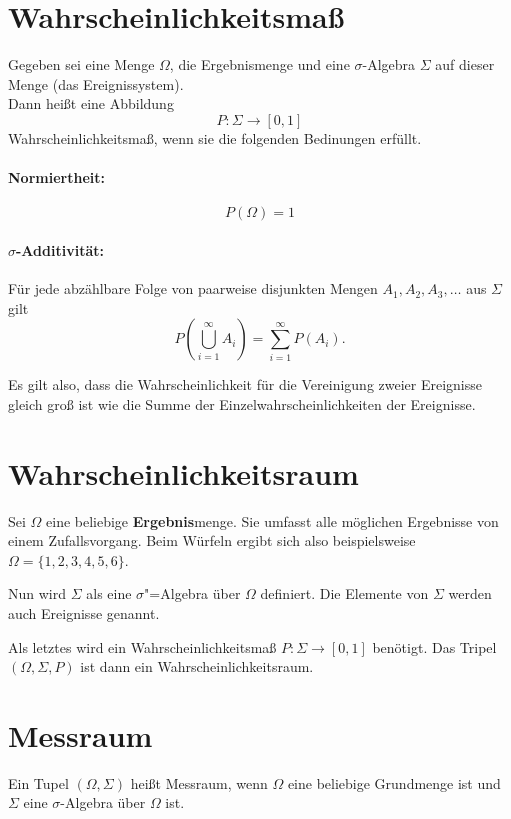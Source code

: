 \documentclass[paper=a4,10pt]{scrartcl}
\begin{document}
\section{Wahrscheinlichkeitsmaß}
Gegeben sei eine Menge $\Omega$, die Ergebnismenge und eine $\sigma$-Algebra $\Sigma$ auf dieser Menge (das Ereignissystem).\\

\noindent
Dann heißt eine Abbildung
\begin{equation}
P: \Sigma \rightarrow [0,1]
\end{equation}
Wahrscheinlichkeitsmaß, wenn sie die folgenden Bedinungen erfüllt.

\paragraph{Normiertheit:}
\begin{equation}
P(\Omega) = 1
\end{equation}

\paragraph{$\sigma$-Additivität:}
Für jede abzählbare Folge von paarweise disjunkten Mengen $A_1, A_2, A_3, \dots$ aus $\Sigma$ gilt
\begin{equation}
P\left( \bigcup^{\infty}_{i=1}A_i\right) = \sum_{i=1}^{\infty} P(A_i). 
\end{equation} 

\noindent
Es gilt also, dass die Wahrscheinlichkeit für die Vereinigung zweier Ereignisse gleich groß ist wie die Summe der Einzelwahrscheinlichkeiten der Ereignisse.

\section{Wahrscheinlichkeitsraum}
Sei $\Omega$ eine beliebige \textbf{Ergebnis}menge. Sie umfasst alle möglichen Ergebnisse von einem Zufallsvorgang. Beim Würfeln ergibt sich also beispielsweise $\Omega = \{ 1,2,3,4,5,6\}$.

\noindent
Nun wird $\Sigma$ als eine $\sigma$"=Algebra über $\Omega$ definiert. Die Elemente von $\Sigma$ werden auch Ereignisse genannt. 

\noindent
Als letztes wird ein Wahrscheinlichkeitsmaß $P: \Sigma \rightarrow [0,1]$ benötigt. Das Tripel $(\Omega, \Sigma, P)$ ist dann ein Wahrscheinlichkeitsraum.
 

\section{Messraum}
Ein Tupel $(\Omega, \Sigma)$ heißt Messraum, wenn $\Omega$ eine beliebige Grundmenge ist und $\Sigma$ eine $\sigma$-Algebra über $\Omega$ ist.
\end{document}
